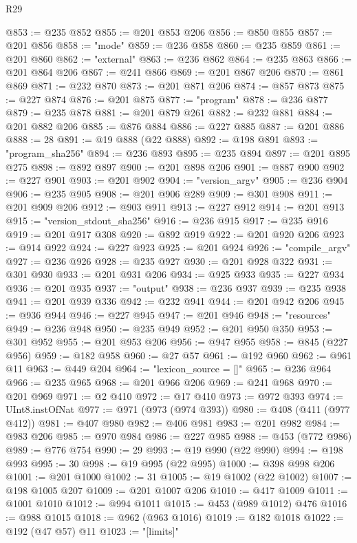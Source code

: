 \begin{lexlean}{R29}
\begin{coremodule}
@853 := @235 @852
@855 := @201 @853 @206
@856 := @850 @855
@857 := @201 @856
@858 := "mode"
@859 := @236 @858
@860 := @235 @859
@861 := @201 @860
@862 := "external"
@863 := @236 @862
@864 := @235 @863
@866 := @201 @864 @206
@867 := @241 @866
@869 := @201 @867 @206
@870 := @861 @869
@871 := @232 @870
@873 := @201 @871 @206
@874 := @857 @873
@875 := @227 @874
@876 := @201 @875
@877 := "program"
@878 := @236 @877
@879 := @235 @878
@881 := @201 @879 @261
@882 := @232 @881
@884 := @201 @882 @206
@885 := @876 @884
@886 := @227 @885
@887 := @201 @886
@888 := 28
@891 := @19 @888 (@22 @888)
@892 := @198 @891
@893 := "program_sha256"
@894 := @236 @893
@895 := @235 @894
@897 := @201 @895 @275
@898 := @892 @897
@900 := @201 @898 @206
@901 := @887 @900
@902 := @227 @901
@903 := @201 @902
@904 := "version_argv"
@905 := @236 @904
@906 := @235 @905
@908 := @201 @906 @289
@909 := @301 @908
@911 := @201 @909 @206
@912 := @903 @911
@913 := @227 @912
@914 := @201 @913
@915 := "version_stdout_sha256"
@916 := @236 @915
@917 := @235 @916
@919 := @201 @917 @308
@920 := @892 @919
@922 := @201 @920 @206
@923 := @914 @922
@924 := @227 @923
@925 := @201 @924
@926 := "compile_argv"
@927 := @236 @926
@928 := @235 @927
@930 := @201 @928 @322
@931 := @301 @930
@933 := @201 @931 @206
@934 := @925 @933
@935 := @227 @934
@936 := @201 @935
@937 := "output"
@938 := @236 @937
@939 := @235 @938
@941 := @201 @939 @336
@942 := @232 @941
@944 := @201 @942 @206
@945 := @936 @944
@946 := @227 @945
@947 := @201 @946
@948 := "resources"
@949 := @236 @948
@950 := @235 @949
@952 := @201 @950 @350
@953 := @301 @952
@955 := @201 @953 @206
@956 := @947 @955
@958 := @845 (@227 @956)
@959 := @182 @958
@960 := @27 @57
@961 := @192 @960
@962 := @961 @11
@963 := @449 @204
@964 := "lexicon_source = []"
@965 := @236 @964
@966 := @235 @965
@968 := @201 @966 @206
@969 := @241 @968
@970 := @201 @969
@971 := @2 @410
@972 := @17 @410
@973 := @972 @393
@974 := UInt8.instOfNat
@977 := @971 (@973 (@974 @393))
@980 := @408 (@411 (@977 @412))
@981 := @407 @980
@982 := @406 @981
@983 := @201 @982
@984 := @983 @206
@985 := @970 @984
@986 := @227 @985
@988 := @453 (@772 @986)
@989 := @776 @754
@990 := 29
@993 := @19 @990 (@22 @990)
@994 := @198 @993
@995 := 30
@998 := @19 @995 (@22 @995)
@1000 := @398 @998 @206
@1001 := @201 @1000
@1002 := 31
@1005 := @19 @1002 (@22 @1002)
@1007 := @198 @1005 @207
@1009 := @201 @1007 @206
@1010 := @417 @1009
@1011 := @1001 @1010
@1012 := @994 @1011
@1015 := @453 (@989 @1012) @476
@1016 := @988 @1015
@1018 := @962 (@963 @1016)
@1019 := @182 @1018
@1022 := @192 (@47 @57) @11
@1023 := "[limits]"

\end{coremodule}
\end{lexlean}
